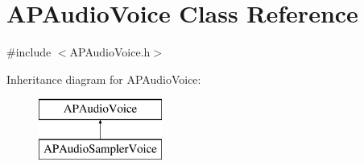 \hypertarget{class_a_p_audio_voice}{\section{A\+P\+Audio\+Voice Class Reference}
\label{class_a_p_audio_voice}
}


{\ttfamily \#include $<$A\+P\+Audio\+Voice.\+h$>$}

Inheritance diagram for A\+P\+Audio\+Voice\+:\begin{figure}[H]
\begin{center}
\leavevmode
\includegraphics[height=2.000000cm]{class_a_p_audio_voice}
\end{center}
\end{figure}
